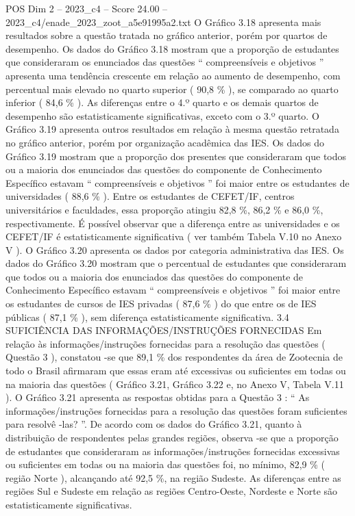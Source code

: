 \begin{textsample}{POS Dim 2 – 2023\_c4 – Score 24.00 – 2023\_c4/enade\_2023\_zoot\_a5e91995a2.txt}
O Gráfico 3.18 apresenta mais resultados sobre a questão tratada no gráfico anterior, porém por quartos de desempenho.
Os dados do Gráfico 3.18 mostram que a proporção de estudantes que consideraram os enunciados das questões “ compreensíveis e objetivos ” apresenta uma tendência crescente em relação ao aumento de desempenho, com percentual mais elevado no quarto superior ( 90,8 \% ), se comparado ao quarto inferior ( 84,6 \% ).
As diferenças entre o 4.º quarto e os demais quartos de desempenho são estatisticamente significativas, exceto com o 3.º quarto.
O Gráfico 3.19 apresenta outros resultados em relação à mesma questão retratada no gráfico anterior, porém por organização acadêmica das IES.
Os dados do Gráfico 3.19 mostram que a proporção dos presentes que consideraram que todos ou a maioria dos enunciados das questões do componente de Conhecimento Específico estavam “ compreensíveis e objetivos ” foi maior entre os estudantes de universidades ( 88,6 \% ).
Entre os estudantes de CEFET/IF, centros universitários e faculdades, essa proporção atingiu 82,8 \%, 86,2 \% e 86,0 \%, respectivamente.
É possível observar que a diferença entre as universidades e os CEFET/IF é estatisticamente significativa ( ver também Tabela V.10 no Anexo V ).
O Gráfico 3.20 apresenta os dados por categoria administrativa das IES.
Os dados do Gráfico 3.20 mostram que o percentual de estudantes que consideraram que todos ou a maioria dos enunciados das questões do componente de Conhecimento Específico estavam “ compreensíveis e objetivos ” foi maior entre os estudantes de cursos de IES privadas ( 87,6 \% ) do que entre os de IES públicas ( 87,1 \% ), sem diferença estatisticamente significativa. 3.4 SUFICIÊNCIA DAS INFORMAÇÕES/INSTRUÇÕES FORNECIDAS Em relação às informações/instruções fornecidas para a resolução das questões ( Questão 3 ), constatou -se que 89,1 \% dos respondentes da área de Zootecnia de todo o Brasil afirmaram que essas eram até excessivas ou suficientes em todas ou na maioria das questões ( Gráfico 3.21, Gráfico 3.22 e, no Anexo V, Tabela V.11 ).
O Gráfico 3.21 apresenta as respostas obtidas para a Questão 3 : “ As informações/instruções fornecidas para a resolução das questões foram suficientes para resolvê -las? ”.
De acordo com os dados do Gráfico 3.21, quanto à distribuição de respondentes pelas grandes regiões, observa -se que a proporção de estudantes que consideraram as informações/instruções fornecidas excessivas ou suficientes em todas ou na maioria das questões foi, no mínimo, 82,9 \% ( região Norte ), alcançando até 92,5 \%, na região Sudeste.
As diferenças entre as regiões Sul e Sudeste em relação as regiões Centro-Oeste, Nordeste e Norte são estatisticamente significativas.

\end{textsample}
